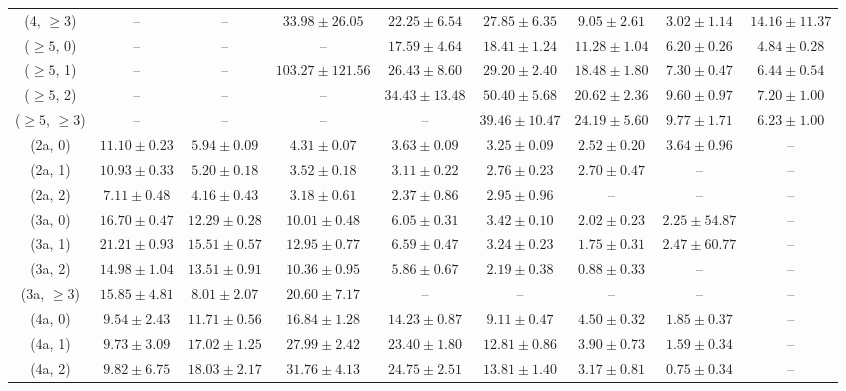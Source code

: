 \begin{table}[h!]
{\begin{tabular}{ccccccccc}
	(4, $\ge3$) & -- & -- & $33.98\pm 26.05$ & $22.25\pm 6.54$ & $27.85\pm 6.35$ & $9.05\pm 2.61$ & $3.02\pm 1.14$ & $14.16\pm 11.37$ \\[0.5ex] 
	($\ge5$, 0) & -- & -- & -- & $17.59\pm 4.64$ & $18.41\pm 1.24$ & $11.28\pm 1.04$ & $6.20\pm 0.26$ & $4.84\pm 0.28$ \\[0.5ex] 
	($\ge5$, 1) & -- & -- & $103.27\pm 121.56$ & $26.43\pm 8.60$ & $29.20\pm 2.40$ & $18.48\pm 1.80$ & $7.30\pm 0.47$ & $6.44\pm 0.54$ \\[0.5ex] 
	($\ge5$, 2) & -- & -- & -- & $34.43\pm 13.48$ & $50.40\pm 5.68$ & $20.62\pm 2.36$ & $9.60\pm 0.97$ & $7.20\pm 1.00$ \\[0.5ex] 
	($\ge5$, $\ge3$) & -- & -- & -- & -- & $39.46\pm 10.47$ & $24.19\pm 5.60$ & $9.77\pm 1.71$ & $6.23\pm 1.00$ \\[0.5ex] 
	(2a, 0) & $11.10\pm 0.23$ & $5.94\pm 0.09$ & $4.31\pm 0.07$ & $3.63\pm 0.09$ & $3.25\pm 0.09$ & $2.52\pm 0.20$ & $3.64\pm 0.96$ & -- \\[0.5ex] 
	(2a, 1) & $10.93\pm 0.33$ & $5.20\pm 0.18$ & $3.52\pm 0.18$ & $3.11\pm 0.22$ & $2.76\pm 0.23$ & $2.70\pm 0.47$ & -- & -- \\[0.5ex] 
	(2a, 2) & $7.11\pm 0.48$ & $4.16\pm 0.43$ & $3.18\pm 0.61$ & $2.37\pm 0.86$ & $2.95\pm 0.96$ & -- & -- & -- \\[0.5ex] 
	(3a, 0) & $16.70\pm 0.47$ & $12.29\pm 0.28$ & $10.01\pm 0.48$ & $6.05\pm 0.31$ & $3.42\pm 0.10$ & $2.02\pm 0.23$ & $2.25\pm 54.87$ & -- \\[0.5ex] 
	(3a, 1) & $21.21\pm 0.93$ & $15.51\pm 0.57$ & $12.95\pm 0.77$ & $6.59\pm 0.47$ & $3.24\pm 0.23$ & $1.75\pm 0.31$ & $2.47\pm 60.77$ & -- \\[0.5ex] 
	(3a, 2) & $14.98\pm 1.04$ & $13.51\pm 0.91$ & $10.36\pm 0.95$ & $5.86\pm 0.67$ & $2.19\pm 0.38$ & $0.88\pm 0.33$ & -- & -- \\[0.5ex] 
	(3a, $\ge3$) & $15.85\pm 4.81$ & $8.01\pm 2.07$ & $20.60\pm 7.17$ & -- & -- & -- & -- & -- \\[0.5ex] 
	(4a, 0) & $9.54\pm 2.43$ & $11.71\pm 0.56$ & $16.84\pm 1.28$ & $14.23\pm 0.87$ & $9.11\pm 0.47$ & $4.50\pm 0.32$ & $1.85\pm 0.37$ & -- \\[0.5ex] 
	(4a, 1) & $9.73\pm 3.09$ & $17.02\pm 1.25$ & $27.99\pm 2.42$ & $23.40\pm 1.80$ & $12.81\pm 0.86$ & $3.90\pm 0.73$ & $1.59\pm 0.34$ & -- \\[0.5ex] 
	(4a, 2) & $9.82\pm 6.75$ & $18.03\pm 2.17$ & $31.76\pm 4.13$ & $24.75\pm 2.51$ & $13.81\pm 1.40$ & $3.17\pm 0.81$ & $0.75\pm 0.34$ & -- \\[0.5ex] 

\end{tabular}}
\end{table}
